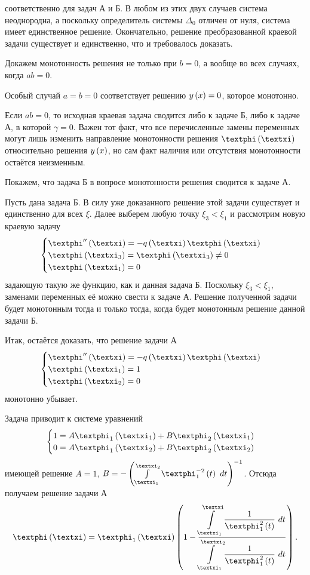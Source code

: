 \documentclass[a5paper,10pt]{article}
\begin{document}
соответственно для задач А и Б. В любом из этих двух случаев система неоднородна, а поскольку определитель системы $\Delta_{0}$ отличен от нуля, система имеет единственное решение. Окончательно, решение преобразованной краевой задачи существует и единственно, что и требовалось доказать.

\begin{step} Докажем монотонность решения не только при $b = 0$, а вообще во всех случаях, когда $ab = 0$. \end{step}

Особый случай $a = b = 0$ соответствует решению $y\left(x\right) = 0$, которое монотонно.

Если $ab = 0$, то исходная краевая задача сводится либо к задаче Б, либо к задаче А, в которой $\gamma = 0$. Важен тот факт, что все перечисленные замены переменных могут лишь изменить направление монотонности решения $\phi\br{\xi}$ относительно решения $y\left(x\right)$, но сам факт наличия или отсутствия монотонности остаётся неизменным.

Покажем, что задача Б в вопросе монотонности решения сводится к задаче А.

Пусть дана задача Б. В силу уже доказанного решение этой задачи существует и единственно для всех $\xi$. Далее выберем любую точку $\xi_{3} < \xi_{1}$ и рассмотрим новую краевую задачу
$$
\begin{cases} \phi''\br{\xi} = -q\br{\xi}\phi\br{\xi} \\ 
\phi\br{\xi_{3}} = \phi\br{\xi_{3}} \ne 0 \\
\phi\br{\xi_{1}} = 0 \end{cases}
$$
задающую такую же функцию, как и данная задача Б. Поскольку $\xi_{3} < \xi_{1}$, заменами переменных её можно свести к задаче А. Решение полученной задачи будет монотонным тогда и только тогда, когда будет монотонным решение данной задачи Б.

Итак, остаётся доказать, что решение задачи А
$$\begin{cases} \phi''\br{\xi} = -q\br{\xi}\phi\br{\xi} \\
\phi\br{\xi_{1}} = 1 \\
\phi\br{\xi_{2}} = 0 \end{cases}$$
монотонно убывает.

Задача приводит к системе уравнений
$$\begin{cases}
    1 = A\phi_{1}\br{\xi_{1}} + B\phi_{2}\br{\xi_{1}} \\
    0 = A\phi_{1}\br{\xi_{2}} + B\phi_{2}\br{\xi_{2}}
\end{cases}$$
имеющей решение $A = 1$, $B = - \br{\int\limits_{\xi_{1}}^{\xi_{2}} {\phi_{1}^{-2} \br{t} \ dt}}^{-1}$. Отсюда получаем решение задачи А
$$\phi\br{\xi} = \phi_{1}\br{\xi} \br{1 - \frac {\tintlim{\xi_{1}}{\xi} {\frac {1} {\phi_{1}^{2} \br{t}} \ dt}} {\tintlim{\xi_{1}}{\xi_{2}} {\frac {1} {\phi_{1}^{2} \br{t}} \ dt}}}.$$
\end{document}
